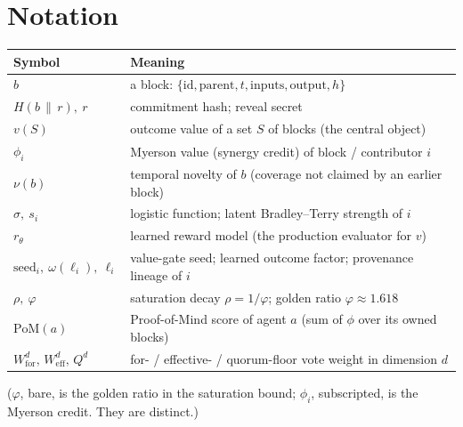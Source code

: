 \documentclass[10pt]{article}
\begin{document}
\section*{Notation}
\small
\begin{center}
\begin{tabular}{@{}ll@{}}
\toprule
\textbf{Symbol} & \textbf{Meaning} \\
\midrule
$b$ & a block: $\{\mathrm{id},\mathrm{parent},t,\mathrm{inputs},\mathrm{output},h\}$ \\
$H(b\,\|\,r),\ r$ & commitment hash; reveal secret \\
$v(S)$ & outcome value of a set $S$ of blocks (the central object) \\
$\phi_i$ & Myerson value (synergy credit) of block / contributor $i$ \\
$\nu(b)$ & temporal novelty of $b$ (coverage not claimed by an earlier block) \\
$\sigma,\ s_i$ & logistic function; latent Bradley--Terry strength of $i$ \\
$r_\theta$ & learned reward model (the production evaluator for $v$) \\
$\mathrm{seed}_i,\ \omega(\ell_i),\ \ell_i$ & value-gate seed; learned outcome factor; provenance lineage of $i$ \\
$\rho,\ \varphi$ & saturation decay $\rho=1/\varphi$; golden ratio $\varphi\approx1.618$ \\
$\mathrm{PoM}(a)$ & Proof-of-Mind score of agent $a$ (sum of $\phi$ over its owned blocks) \\
$W^{d}_{\text{for}},\,W^{d}_{\text{eff}},\,Q^{d}$ & for- / effective- / quorum-floor vote weight in dimension $d$ \\
\bottomrule
\end{tabular}
\end{center}
\normalsize
($\varphi$, bare, is the golden ratio in the saturation bound; $\phi_i$, subscripted, is the Myerson
credit. They are distinct.)
\end{document}
